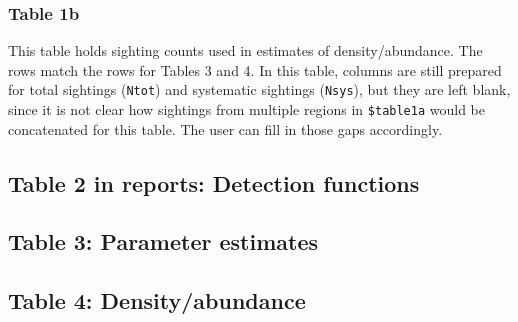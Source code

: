 \documentclass[
]{book}
\newenvironment{Shaded}{\begin{snugshade}}{\end{snugshade}}
\newcommand{\AttributeTok}[1]{\textcolor[rgb]{0.77,0.63,0.00}{#1}}
\newcommand{\FunctionTok}[1]{\textcolor[rgb]{0.00,0.00,0.00}{#1}}
\newcommand{\NormalTok}[1]{#1}
\newcommand{\SpecialCharTok}[1]{\textcolor[rgb]{0.00,0.00,0.00}{#1}}
\newcommand{\StringTok}[1]{\textcolor[rgb]{0.31,0.60,0.02}{#1}}
\begin{document}
\hypertarget{table-1b}{%
\subsubsection*{Table 1b}\label{table-1b}}

This table holds sighting counts used in estimates of density/abundance. The rows match the rows for Tables 3 and 4. In this table, columns are still prepared for total sightings (\texttt{Ntot}) and systematic sightings (\texttt{Nsys}), but they are left blank, since it is not clear how sightings from multiple regions in \texttt{\$table1a} would be concatenated for this table. The user can fill in those gaps accordingly.

\begin{Shaded}
\end{Shaded}

\hypertarget{table-2-in-reports-detection-functions}{%
\subsection*{Table 2 in reports: Detection functions}\label{table-2-in-reports-detection-functions}}

\hypertarget{table-3-parameter-estimates}{%
\subsection*{Table 3: Parameter estimates}\label{table-3-parameter-estimates}}

\hypertarget{table-4-densityabundance}{%
\subsection*{Table 4: Density/abundance}\label{table-4-densityabundance}}
\end{document}
